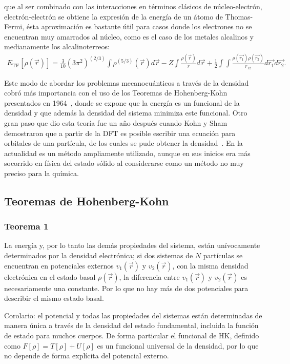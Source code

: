 \noindent que al ser combinado con las interacciones en términos clásicos de
núcleo-electrón, electrón-electrón se obtiene la expresión de la energía de un
átomo de Thomas-Fermi, ésta aproximación es bastante útil para casos donde los
electrones no se encuentran muy amarrados al núcleo, como es el caso de los
metales alcalinos y medianamente los alcalinoterreos:
%
\begin{align}
  {E}_{\mathrm{TF}}[\rho(\vec{r})]=\displaystyle\frac{3}{10}(3\pi^2)^{(2/3)}\int
  \rho^{(5/3)}(\vec{r})d\vec{r}-Z\int\displaystyle\frac{\rho(\vec{r})}{r}d\vec{r} +
  \displaystyle\frac{1}{2}\int\int\displaystyle\frac{\rho(\vec{r_1})\rho(\vec{r_2})}{r_{12}}
  d\vec{r_1}d\vec{r_2}.
\end{align}

Este modo de abordar los problemas mecanocuánticos a través de la densidad
cobró más importancia con el uso de los Teoremas de Hohenberg-Kohn presentados
en 1964~\cite{Hohenberg1964}, donde se expone que la energía es un funcional de
la densidad y que además la densidad del sistema minimiza este funcional. Otro
gran paso que dio esta teoría fue un año después cuando Kohn y Sham demostraron
que a partir de la DFT es posible escribir una ecuación para orbitales de una
partícula, de los cuales se pude obtener la densidad~\cite{Kohn1965}. En la
actualidad es un método ampliamente utilizado, aunque en sus inicios era más
socorrido en física del estado sólido al considerarse como un método no muy
preciso para la química.

\subsection{Teoremas de Hohenberg-Kohn}
\subsubsection{Teorema 1}

La energía y, por lo tanto las demás propiedades del sistema, están
unívocamente determinados por la densidad electrónica; si dos sistemas de $N$
partículas se encuentran en potenciales externos $v_{1} (\vec{r})$ y $v_{2}
(\vec{r})$, con la misma densidad electrónica en el estado basal
$\rho(\vec{r})$, la diferencia entre $v_{1} (\vec{r})$ y $v_{2} (\vec{r})$ es
necesariamente una constante. Por lo que no hay más de dos potenciales para
describir el mismo estado basal.

Corolario: el potencial y todas las propiedades del sistemas están determinadas
de manera única a través de la densidad del estado fundamental, incluida la
función de estado para muchos cuerpos. De forma particular el funcional de HK,
definido como $F[\rho]=T[\rho]+U[\rho]$ es un funcional universal de la
densidad, por lo que no depende de forma explícita del potencial externo.


